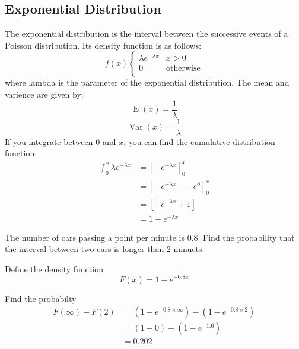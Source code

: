     \newpage
    \subsection{Exponential Distribution}
        The exponential distribution is the interval between the successive events of a Poisson distribution. Its density function is as follows:
        $$
        f(x)
        \begin{cases}
        \lambda e^{-\lambda x} & x > 0\\
        0 & \text{otherwise}\\
        \end{cases}
        $$
        where lambda is the parameter of the exponential distribution. The mean and varience are given by:
        $$\operatorname{E}(x) = \frac{1}{\lambda}$$
        $$\operatorname{Var}(x) = \frac{1}{\lambda}$$
        If you integrate between $0$ and $x$, you can find the cumulative distribution function:
        \begin{align*}
        \int^{x}_{0}{\lambda e^{-\lambda x}}
        &= [-e^{-\lambda x}]^x_0\\
        &= [-e^{-\lambda x} -- e^{0}]^x_0\\
        &= [-e^{-\lambda x} + 1]\\
        &= 1 - e^{-\lambda x}
        \end{align*}

        \begin{example}
        {
        The number of cars passing a point per minute is 0.8. Find the probability that the interval between two cars is longer than 2 minuets.
        }

        \begin{step}{Define the density function}
        $$
        F(x) = 1 - e^{-0.8x}
        $$
        \end{step}

        \begin{step}{Find the probabilty}
        \begin{align*}
        F(\infty) - F(2) 
        &= (1 - e^{-0.8 \times \infty}) - (1 - e^{-0.8 \times 2})\\
        &= (1 - 0) - (1 - e^{-1.6})\\
        &= 0.202
        \end{align*}
        \end{step}

        \end{example}

